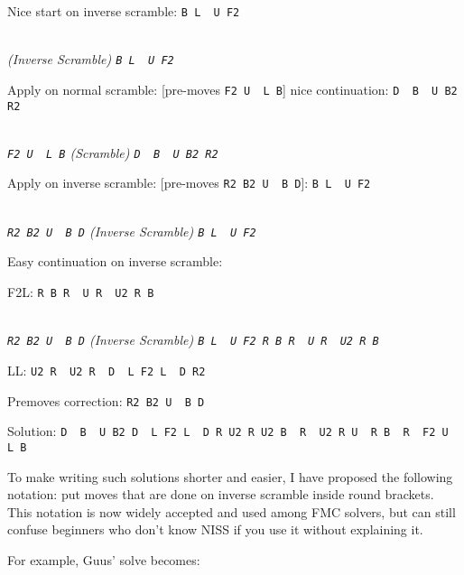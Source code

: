 \documentclass[11pt,a4paper]{book}
\newcommand{\p}{\textquotesingle}
\newcommand{\m}{\texttt}
\newcommand{\ps}{\p\,\,}
\begin{document}
\begin{framed}
Nice start on inverse scramble: \m{B L\ps U F2}

\begin{center}
\\ \emph{(Inverse Scramble) \m{B L\ps U F2}}
\end{center}

Apply on normal scramble: [pre-moves \m{F2 U\ps L B\p}] nice continuation: \m{D\ps B\ps U B2 R2}

\begin{center}
\\ \emph{\m{F2 U\ps L B\p} (Scramble) \m{D\ps B\ps U B2 R2}}
\end{center}

Apply on inverse scramble: [pre-moves \m{R2 B2 U\ps B D}]: \m{B L\ps U F2}

\begin{center}
\\ \emph{\m{R2 B2 U\ps B D} (Inverse Scramble) \m{B L\ps U F2}}
\end{center}

Easy continuation on inverse scramble:

F2L: \m{R B R\ps U R\ps U2 R B}

\begin{center}
\\ \emph{\m{R2 B2 U\ps B D} (Inverse Scramble) \m{B L\ps U F2 R B R\ps U R\ps U2 R B}}
\end{center}

LL: \m{U2 R\ps U2 R\ps D\ps L F2 L\ps D R2}

Premoves correction: \m{R2 B2 U\ps B D}

Solution: \m{D\ps B\ps U B2 D\ps L F2 L\ps D R U2 R U2 B\ps R\ps U2 R U\ps R B\ps R\ps F2 U\ps L B\p}
\end{framed}

To make writing such solutions shorter and easier, I have proposed the following notation: put moves that are done on inverse scramble inside round brackets. This notation is now widely accepted and used among FMC solvers, but can still confuse beginners who don't know NISS if you use it without explaining it.

For example, Guus' solve becomes:
\end{document}
